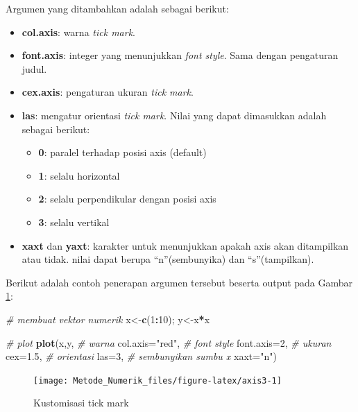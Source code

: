 \documentclass[]{book}
\newenvironment{Shaded}{\begin{snugshade}}{\end{snugshade}}
\newcommand{\CommentTok}[1]{\textcolor[rgb]{0.56,0.35,0.01}{\textit{#1}}}
\newcommand{\DataTypeTok}[1]{\textcolor[rgb]{0.13,0.29,0.53}{#1}}
\newcommand{\DecValTok}[1]{\textcolor[rgb]{0.00,0.00,0.81}{#1}}
\newcommand{\FloatTok}[1]{\textcolor[rgb]{0.00,0.00,0.81}{#1}}
\newcommand{\KeywordTok}[1]{\textcolor[rgb]{0.13,0.29,0.53}{\textbf{#1}}}
\newcommand{\NormalTok}[1]{#1}
\newcommand{\OperatorTok}[1]{\textcolor[rgb]{0.81,0.36,0.00}{\textbf{#1}}}
\newcommand{\StringTok}[1]{\textcolor[rgb]{0.31,0.60,0.02}{#1}}
\providecommand{\tightlist}{%
  \setlength{\itemsep}{0pt}\setlength{\parskip}{0pt}}
\theoremstyle{definition}
\theoremstyle{definition}
\theoremstyle{definition}
\theoremstyle{remark}
\begin{document}
Argumen yang ditambahkan adalah sebagai berikut:

\begin{itemize}
\item
  \textbf{col.axis}: warna \emph{tick mark}.
\item
  \textbf{font.axis}: integer yang menunjukkan \emph{font style}. Sama dengan pengaturan judul.
\item
  \textbf{cex.axis}: pengaturan ukuran \emph{tick mark}.
\item
  \textbf{las}: mengatur orientasi \emph{tick mark}. Nilai yang dapat dimasukkan adalah sebagai berikut:

  \begin{itemize}
  \tightlist
  \item
    \textbf{0}: paralel terhadap posisi axis (default)
  \item
    \textbf{1}: selalu horizontal
  \item
    \textbf{2}: selalu perpendikular dengan posisi axis
  \item
    \textbf{3}: selalu vertikal
  \end{itemize}
\item
  \textbf{xaxt} dan \textbf{yaxt}: karakter untuk menunjukkan apakah axis akan ditampilkan atau tidak. nilai dapat berupa ``n''(sembunyika) dan ``s''(tampilkan).
\end{itemize}

Berikut adalah contoh penerapan argumen tersebut beserta output pada Gambar \ref{fig:axis3}:

\begin{Shaded}
\begin{Highlighting}[]
\CommentTok{# membuat vektor numerik}
\NormalTok{x<-}\KeywordTok{c}\NormalTok{(}\DecValTok{1}\OperatorTok{:}\DecValTok{10}\NormalTok{); y<-x}\OperatorTok{*}\NormalTok{x}

\CommentTok{# plot}
\KeywordTok{plot}\NormalTok{(x,y,}
     \CommentTok{# warna}
     \DataTypeTok{col.axis=}\StringTok{"red"}\NormalTok{,}
     \CommentTok{# font style}
     \DataTypeTok{font.axis=}\DecValTok{2}\NormalTok{,}
     \CommentTok{# ukuran}
     \DataTypeTok{cex=}\FloatTok{1.5}\NormalTok{,}
     \CommentTok{# orientasi}
     \DataTypeTok{las=}\DecValTok{3}\NormalTok{,}
     \CommentTok{# sembunyikan sumbu x}
     \DataTypeTok{xaxt=}\StringTok{"n"}\NormalTok{)}
\end{Highlighting}
\end{Shaded}

\begin{figure}

{\centering \texttt{[image: Metode\_Numerik\_files/figure-latex/axis3-1]} 

}

\caption{Kustomisasi tick mark}\label{fig:axis3}
\end{figure}
\end{document}
